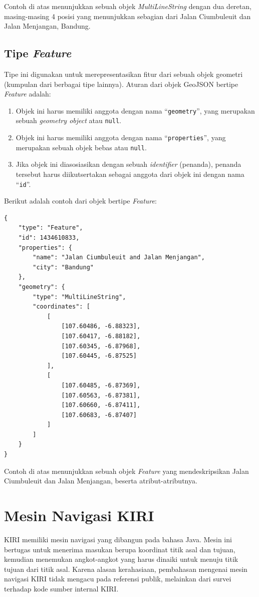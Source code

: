 Contoh di atas menunjukkan sebuah objek \textit{MultiLineString} dengan dua deretan, masing-masing 4 posisi yang menunjukkan sebagian dari Jalan Ciumbuleuit dan Jalan Menjangan, Bandung.

\subsection{Tipe \textit{Feature}}

Tipe ini digunakan untuk merepresentasikan fitur dari sebuah objek geometri (kumpulan dari berbagai tipe lainnya). Aturan dari objek GeoJSON bertipe \textit{Feature} adalah:

\begin{enumerate}
	\item Objek ini harus memiliki anggota dengan nama ``\texttt{geometry}'', yang merupakan sebuah \textit{geometry object} atau \texttt{null}.
	\item Objek ini harus memiliki anggota dengan nama ``\texttt{properties}'', yang merupakan sebuah objek bebas atau \texttt{null}.
	\item Jika objek ini diasosiasikan dengan sebuah \textit{identifier} (penanda), penanda tersebut harus diikutsertakan sebagai anggota dari objek ini dengan nama ``\texttt{id}''.
\end{enumerate}

Berikut adalah contoh dari objek bertipe \textit{Feature}:

\begin{lstlisting}
{
	"type": "Feature",
	"id": 1434610833,
	"properties": {
		"name": "Jalan Ciumbuleuit and Jalan Menjangan",
		"city": "Bandung"
	},
	"geometry": {
		"type": "MultiLineString",
		"coordinates": [
			[
				[107.60486, -6.88323],
				[107.60417, -6.88182],
				[107.60345, -6.87968],
				[107.60445, -6.87525]
			],
			[
				[107.60485, -6.87369],
				[107.60563, -6.87381],
				[107.60660, -6.87411],
				[107.60683, -6.87407]
			]
		]
	}
}
\end{lstlisting}

Contoh di atas menunjukkan sebuah objek \textit{Feature} yang mendeskripsikan Jalan Ciumbuleuit dan Jalan Menjangan, beserta atribut-atributnya.

\section{Mesin Navigasi KIRI}

KIRI memiliki mesin navigasi yang dibangun pada bahasa Java. Mesin ini bertugas untuk menerima masukan berupa koordinat titik asal dan tujuan, kemudian menemukan angkot-angkot yang harus dinaiki untuk menuju titik tujuan dari titik asal. Karena alasan kerahasiaan, pembahasan mengenai mesin navigasi KIRI tidak mengacu pada referensi publik, melainkan dari survei terhadap kode sumber internal KIRI.

